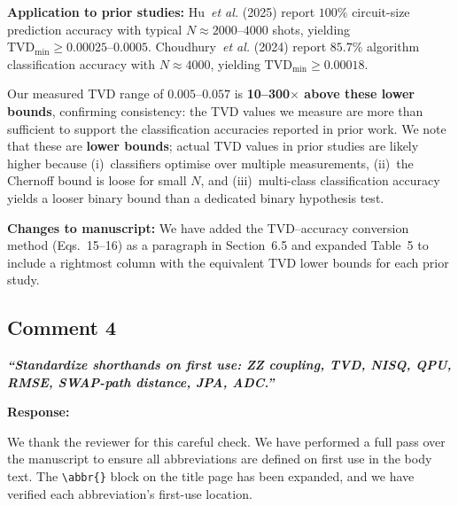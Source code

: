 \documentclass[11pt,a4paper]{article}
\begin{document}
\medskip\noindent\textbf{Application to prior studies:}
Hu~\emph{et al.} (2025) report $100\%$ circuit-size prediction accuracy with typical
$N \approx 2000$--$4000$ shots, yielding $\mathrm{TVD}_{\mathrm{min}} \geq 0.00025$--$0.0005$.
Choudhury~\emph{et al.} (2024) report $85.7\%$ algorithm classification accuracy with
$N \approx 4000$, yielding $\mathrm{TVD}_{\mathrm{min}} \geq 0.00018$.

Our measured TVD range of $0.005$--$0.057$ is \textbf{10--300$\times$ above these lower
bounds}, confirming consistency: the TVD values we measure are more than sufficient to
support the classification accuracies reported in prior work. We note that these are
\textbf{lower bounds}; actual TVD values in prior studies are likely higher because
(i)~classifiers optimise over multiple measurements, (ii)~the Chernoff bound is loose for
small $N$, and (iii)~multi-class classification accuracy yields a looser binary bound than
a dedicated binary hypothesis test.

\medskip\noindent\textbf{Changes to manuscript:} We have added the TVD--accuracy conversion
method (Eqs.~15--16) as a paragraph in Section~6.5 and expanded Table~5 to include a
rightmost column with the equivalent TVD lower bounds for each prior study.

\subsection*{Comment 4}

\noindent\textbf{\textit{``Standardize shorthands on first use: ZZ coupling, TVD, NISQ,
QPU, RMSE, SWAP-path distance, JPA, ADC.''}}

\medskip\noindent\textbf{Response:}

We thank the reviewer for this careful check. We have performed a full pass over the
manuscript to ensure all abbreviations are defined on first use in the body text. The
\verb|\abbr{}| block on the title page has been expanded, and we have verified each
abbreviation's first-use location.
\end{document}
